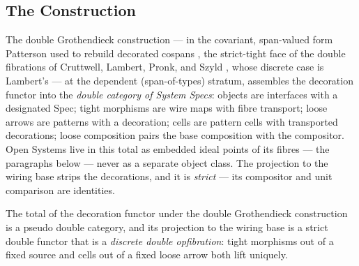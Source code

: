 \subsection{The Construction}

The double Grothendieck construction ---
in the covariant, span-valued form Patterson \cite{patterson23} used
to rebuild decorated cospans \cite{fong15}, the strict-tight face of the double
fibrations of Cruttwell, Lambert, Pronk, and Szyld
\cite{cruttwell22b}, whose discrete case is Lambert's
\cite{lambert21a} --- at the dependent (span-of-types) stratum,
assembles the decoration functor into the \emph{double category of
System Specs}: objects are interfaces with a
designated Spec; tight morphisms are wire maps with
fibre transport; loose arrows are patterns with a decoration;
cells are pattern cells with transported decorations; loose
composition pairs the base composition with the compositor. Open
Systems live in this total as embedded ideal points of its fibres
--- the paragraphs below --- never as a separate object class. The
projection to the wiring base strips the decorations, and it is
\emph{strict} --- its compositor and unit comparison are
identities.

\begin{theorem}
\label{thm:su-assembly}
The total of the decoration functor under the double Grothendieck
construction is a pseudo double category, and its projection to the
wiring base is a strict double functor that is a \emph{discrete
double opfibration}: tight morphisms out of a fixed source and cells
out of a fixed loose arrow both lift uniquely.
\end{theorem}

